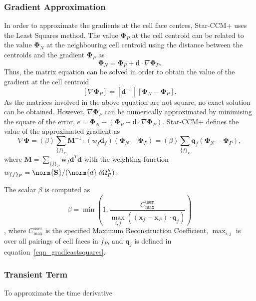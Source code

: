 \subsubsection{Gradient Approximation}
In order to approximate the gradients at the cell face centres, Star-CCM+ uses the Least Squares method. The value $\mathbf{\Phi}_{P}$ at the cell centroid
can be related to the value $\mathbf{\Phi}_{N}$ at the neighbouring cell centroid using the distance between the centroids and the gradient $\mathbf{\Phi}_{P}$ as
\begin{equation*}
    \mathbf{\Phi}_{N} = \mathbf{\Phi}_{P} + \mathbf{d} \cdot \nabla \mathbf{\Phi}_{P}.
\end{equation*}
Thus, the matrix equation can be solved in order to obtain the value of the gradient at the cell centroid
\begin{equation}
    \left[\nabla \mathbf{\Phi}_{P}\right] = \left[\mathbf{d}^{-1}\right]\left[\mathbf{\Phi}_{N} - \mathbf{\Phi}_{P}\right].
\end{equation}
As the matrices involved in the above equation are not square, no exact solution can be obtained. However, $\nabla \mathbf{\Phi}_{P}$ can be numerically approximated
by minimising the square of the error, $e = \mathbf{\Phi}_{N} - (\mathbf{\Phi}_{P} + \mathbf{d} \cdot \nabla \mathbf{\Phi}_{P})$.
Star-CCM+ defines the value of the approximated gradient as
\begin{equation}\label{eqn_gradleastsquares}
    \nabla \mathbf{\Phi} = (\beta) \sum_{\{f\}_{P}} \mathbf{M}^{-1} \cdot (w_{f} \mathbf{d}_{f})(\mathbf{\Phi}_{N} - \mathbf{\Phi}_{P}) 
    = (\beta) \sum_{\{f\}_{P}} \mathbf{q}_{f}(\mathbf{\Phi}_{N} - \mathbf{\Phi}_{P}),
\end{equation}
where $\mathbf{M} = \sum_{\{f\}_{P}} \mathbf{w}_{f} \mathbf{d}^T \mathbf{d}$ with the weighting function $w_{\{f\}_{P}} =\norm{\mathbf{S}}/(\norm{d}\;\delta \Omega_{P}^{h})$.

The scalar $\beta$ is computed as 
\begin{equation}
    \beta = \min\left(1, \frac{C^{\text{user}}_{\max}}{\max_{i,j}((\mathbf{x}_{f} - \mathbf{x}_{P}) \cdot \mathbf{q}_{j})}\right)
\end{equation},
where $C^{\text{user}}_{\max}$ is the specified Maximum Reconstruction Coefficient, $\max_{i,j}$ is over all pairings of cell faces in ${f}_{P}$, and $\mathbf{q}_{j}$
is defined in equation~\ref{eqn_gradleastsquares}.

\subsubsection{Transient Term}
To approximate the time derivative


